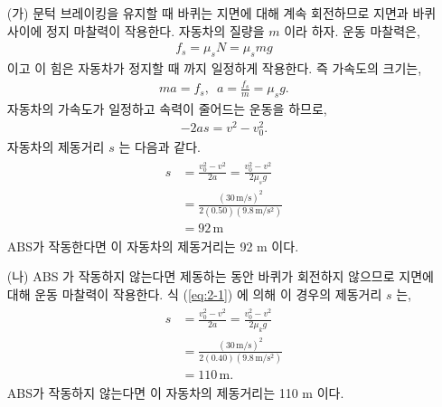 \documentclass[floatfix,nofootinbib,superscriptaddress,fleqn]{revtex4-2}
\begin{document}
\begin{itemize}
  \item[(가)] 문턱 브레이킹을 유지할 때 바퀴는 지면에 대해 계속 회전하므로 지면과 
  바퀴 사이에 정지 마찰력이 작용한다. 자동차의 질량을 $m$ 이라 하자. 운동 마찰력은,
  \begin{align}
    f_s = \mu_s N = \mu_s mg
  \end{align} 
이고 이 힘은 자동차가 정지할 때 까지 일정하게 작용한다. 즉 가속도의 크기는,
\begin{align}
  ma = f_s,\,\,\, a = \frac{f_s}{m}=\mu_s g.
\end{align}
자동차의 가속도가 일정하고 속력이 줄어드는 운동을 하므로,
\begin{align}
  -2as = v^2-v^2_0.
\end{align}
자동차의 제동거리 $s$ 는 다음과 같다.
\begin{align}
  \begin{split}\label{eq:2-1}
    s &= \frac{v^2_0-v^2}{2a} = \frac{v^2_0-v^2}{2\mu_s g}  \\
    &= \frac{(30\,\mathrm{m/s})^2}{2(0.50)(9.8\,\mathrm{m/s^2})}  \\
    &= 92\,\mathrm{m}
  \end{split}
\end{align}
ABS가 작동한다면 이 자동차의 제동거리는 92 m 이다.
  \item[(나)] ABS 가 작동하지 않는다면 제동하는 동안 바퀴가 회전하지 않으므로 
  지면에 대해 운동 마찰력이 작용한다. 식 (\ref{eq:2-1}) 에 의해 이 경우의 
  제동거리 $s$ 는,
  \begin{align}
    \begin{split}
      s &= \frac{v^2_0-v^2}{2a} = \frac{v^2_0-v^2}{2\mu_k g}  \\
      &= \frac{(30\,\mathrm{m/s})^2}{2(0.40)(9.8\,\mathrm{m/s^2})}  \\
      &= 110\,\mathrm{m}.
    \end{split}
  \end{align}
  ABS가 작동하지 않는다면 이 자동차의 제동거리는 110 m 이다.
\end{itemize}

\vspace{1.cm}
\end{document}
